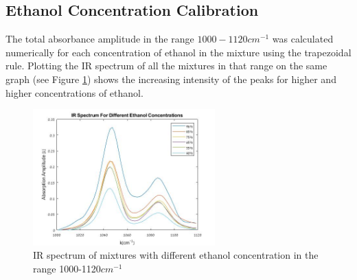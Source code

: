 \documentclass[reprint,amsmath,amssymb,aps, prl]{revtex4-2}
\begin{document}
\subsection{Ethanol Concentration Calibration}
The total absorbance amplitude in the range $1000-1120 cm^{-1}$ was calculated numerically
for each concentration of ethanol in the mixture using the trapezoidal rule\cite{numerical}.
Plotting the IR spectrum of all the mixtures in that range
on the same graph (see Figure \ref{fig:EthanolMixtures})
shows the increasing intensity of the peaks for higher and higher concentrations of ethanol. 
\begin{figure}[h]
    \includegraphics[width=7cm]{Images/EthanolAbsorption.jpg}
    \caption{IR spectrum of mixtures with different ethanol concentration in the range 1000-1120$cm^{-1}$ }
    \label{fig:EthanolMixtures}
    \centering
\end{figure}
\end{document}
